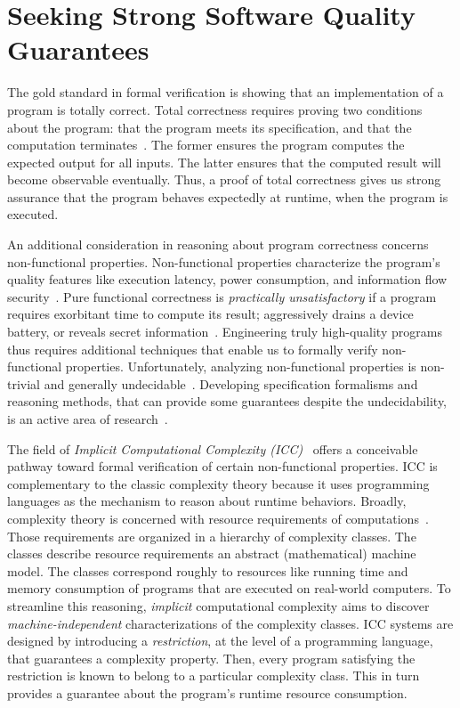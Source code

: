 \section{Seeking Strong Software Quality Guarantees}
\label{sec:aicc-intro}

The gold standard in formal verification is showing that an implementation of a
program is {totally correct}. Total correctness
requires proving two conditions about the program: that the program meets its
specification, and that the computation terminates~\cite{leino2023}. The former
ensures the program computes the expected output for all inputs. The latter
ensures that the computed result will become observable {eventually}. Thus, a
proof of total correctness gives us strong assurance that the program behaves
expectedly at runtime, \ie when the program is executed.

An additional consideration in reasoning about program correctness concerns
{non-functional} properties. Non-functional
properties characterize the program's quality features like execution latency,
power consumption, and information flow security~\cite{terbeek2018}. Pure
functional correctness is \emph{practically unsatisfactory} if a program
requires exorbitant time to compute its result; aggressively drains a device
battery, or reveals secret information~\cite{heraud2011,aubert20222}.
Engineering truly high-quality programs thus requires additional techniques that
enable us to formally verify non-functional properties. Unfortunately, analyzing
non-functional properties is non-trivial and generally
undecidable~\cite{rice1953}. Developing specification
formalisms and reasoning methods, that can provide some guarantees despite the
undecidability, is an active area of research~\cite{etaps2025}.

The field of \emph{Implicit Computational Complexity (ICC)}~\cite{dallago2011}%
offers a
conceivable pathway toward formal verification of certain non-functional
properties. ICC is complementary to the classic complexity theory because it
uses programming languages as the {mechanism} to reason about runtime behaviors.
Broadly, complexity theory is concerned with resource requirements of
computations~\cite{goldreich2008}. Those requirements are organized in a
hierarchy of {complexity classes}. The classes describe resource requirements
\wrt an abstract (mathematical) machine model. The classes correspond roughly to
resources like running time and memory consumption of programs that are executed
on real-world computers. To streamline this reasoning, \emph{implicit}
computational complexity aims to discover \emph{machine-independent}
characterizations of the complexity classes. ICC systems are designed by
introducing a \emph{restriction}, at the level of a programming language, that
guarantees a complexity property. Then, every program satisfying the restriction
is known to belong to a particular complexity class. This in turn provides a
guarantee about the program's runtime resource consumption.

